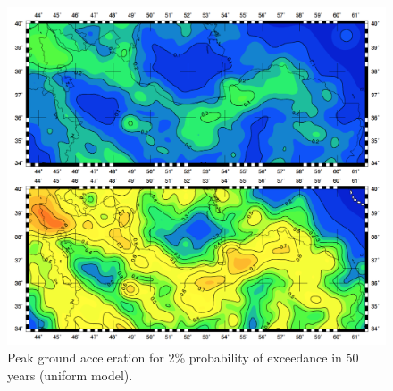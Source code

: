 \begin{figure} [!ht]
\centering
\includegraphics[scale=0.3]{figures/pdf/pga_2_mean_uniform.pdf} 
\caption{Peak ground acceleration for 2\% probability of exceedance in 50 years (uniform model).}
\label{fig:pga_2_mean_uniform}
\end{figure}










